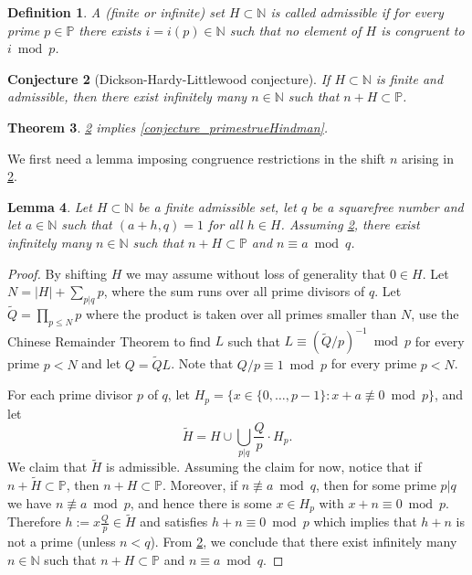 \documentclass[10pt,dvipsnames]{article}
\newtheorem{theorem}{Theorem}[section]
\newtheorem{lemma}[theorem]{Lemma}
\newtheorem{conjecture}[theorem]{Conjecture}
\newtheorem{definition}[theorem]{Definition}
\theoremstyle{definition}
\theoremstyle{plain}
\renewcommand{\P}{\mathbb{P}}
\newcommand{\N}{\mathbb{N}}
\begin{document}
\begin{appendices}
\begin{definition}\label{def_admissible}
    A (finite or infinite) set $H\subset\N$ is called \emph{admissible} if for every prime $p\in\P$ there exists $i=i(p)\in\N$ such that no element of $H$ is congruent to $i\bmod p$.
\end{definition}
\begin{conjecture}[Dickson-Hardy-Littlewood conjecture]\label{conj_hardylittlewood}
If $H\subset\N$ is finite and admissible, then there exist infinitely many $n\in\N$ such that $n+H\subset\P$.
\end{conjecture}

\begin{theorem}
\label{thm_BBtprimes1}
    \cref{conj_hardylittlewood} implies \cref{conjecture_primestrueHindman}.
\end{theorem}

We first need a lemma imposing congruence restrictions in the shift $n$ arising in \cref{conj_hardylittlewood}.

\begin{lemma}\label{lemma_DHLinprogressions}
Let $H\subset\N$ be a finite admissible set, let $q$ be a squarefree number and let $a\in\N$ such that $(a+h,q)=1$ for all $h\in H$.
Assuming \cref{conj_hardylittlewood}, there exist infinitely many $n\in\N$ such that $n+H\subset\P$ and
$n\equiv a\bmod q$.
\end{lemma}
\begin{proof}
By shifting $H$ we may assume without loss of generality that $0\in H$.
Let $N=|H|+\sum_{p|q}p$, where the sum runs over all prime divisors of $q$.
Let $\tilde Q=\prod_{p\leq N}p$ where the product is taken over all primes smaller than $N$, use the Chinese Remainder Theorem to find $L$ such that $L\equiv (\tilde Q/p)^{-1}\bmod p$ for every prime $p<N$ and let $Q=\tilde QL$.
Note that $Q/p\equiv1\bmod p$ for every prime $p<N$.

For each prime divisor $p$ of $q$, let $H_p=\big\{x\in\{0,\dots,p-1\}:x+a\not\equiv0\bmod p\big\}$, and let $$\tilde H=H\cup\bigcup_{p|q}\frac Qp\cdot H_p.$$
We claim that $\tilde H$ is admissible.
Assuming the claim for now, notice that if $n+\tilde H\subset\P$, then $n+H\subset\P$.
Moreover, if $n\not\equiv a\bmod q$, then for some prime $p|q$ we have $n\not\equiv a\bmod p$, and hence there is some $x\in H_p$ with $x+n\equiv0\bmod p$.
Therefore $h:=x\tfrac Q p\in \tilde H$ and satisfies $h+n\equiv0\bmod p$ which implies that $h+n$ is not a prime (unless $n<q$).
From \cref{conj_hardylittlewood}, we conclude that there exist infinitely many $n\in\N$ such that $n+H\subset\P$ and
$n\equiv a\bmod q$.


\end{proof}
\end{appendices}
\end{document}

